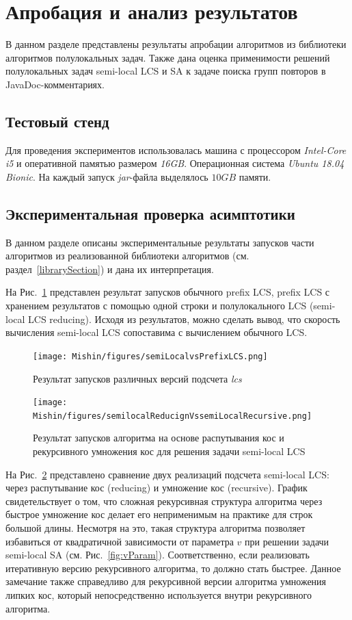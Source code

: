 \section{Апробация и анализ результатов}\label{appob}
В данном разделе представлены результаты апробации алгоритмов из библиотеки алгоритмов полулокальных задач.
Также дана оценка применимости решений полулокальных задач {semi-local LCS и SA} к задаче поиска групп повторов в JavaDoc-комментариях.


\subsection{Тестовый стенд}

Для проведения экспериментов использовалась
машина с процессором \emph{Intel-Core i5} и оперативной памятью размером \emph{16GB}.
Операционная система \emph{Ubuntu 18.04 Bionic}.
На каждый запуск \emph{jar}-файла выделялось $10GB$ памяти.

\subsection{Экспериментальная проверка асимптотики}

В данном разделе описаны экспериментальные результаты запусков части алгоритмов из реализованной библиотеки алгоритмов (см. раздел~\ref{librarySection})  и дана их интерпретация.

На Рис.~\ref{fig:speedLCS} представлен результат запусков
обычного {prefix LCS}, {prefix LCS} с хранением результатов с помощью одной строки и полулокального {LCS} ({semi-local LCS reducing}).
Исходя из результатов, можно сделать вывод, что скорость вычисления {semi-local LCS} сопоставима с вычислением обычного {LCS}.

\begin{figure}[t!]
\centering
    \texttt{[image: Mishin/figures/semiLocalvsPrefixLCS.png]}
    \caption{Результат запусков различных версий подсчета \emph{lcs} }\label{fig:speedLCS}
\end{figure}

\begin{figure}[t!]
\centering
    \texttt{[image: Mishin/figures/semilocalReducignVssemiLocalRecursive.png]}
    \caption{Результат запусков алгоритма на основе распутывания кос и рекурсивного умножения кос для решения задачи {semi-local LCS} }\label{fig:speedLCS2}
\end{figure}

На Рис.~\ref{fig:speedLCS2} представлено сравнение двух реализаций подсчета {semi-local LCS}: через распутывание кос ({reducing}) и  умножение кос ({recursive}).
График свидетельствует о том, что сложная  рекурсивная структура алгоритма через быстрое умножение кос делает его неприменимым на практике  для строк  большой длины. Несмотря на это, такая структура алгоритма позволяет избавиться от квадратичной зависимости от параметра $v$ при решении задачи {semi-local SA} (см. Рис.~\ref{fig:vParam}).
Соответственно, если реализовать итеративную версию рекурсивного алгоритма, то должно стать быстрее.
Данное замечание также справедливо для рекурсивной версии алгоритма умножения липких кос, который непосредственно используется внутри рекурсивного алгоритма.

